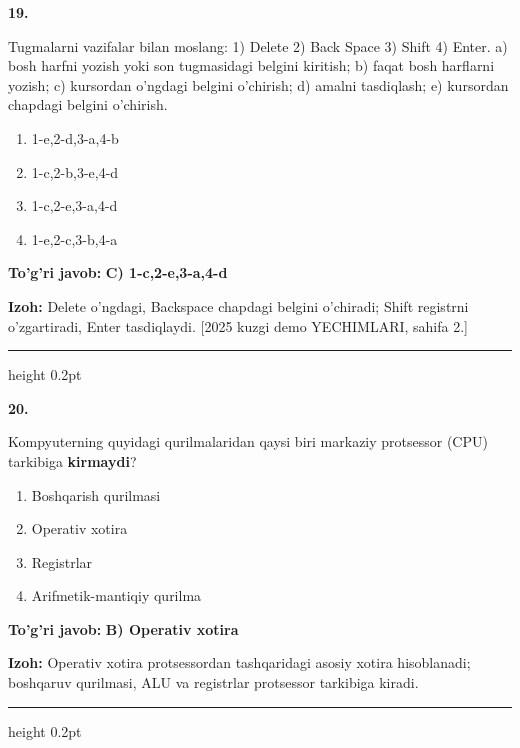 \documentclass[10pt,a4paper]{article}
\begin{document}
{\bfseries\sffamily\color{ink} 19.}
\par
Tugmalarni vazifalar bilan moslang: 1) Delete 2) Back Space 3) Shift 4) Enter. a) bosh harfni yozish yoki son tugmasidagi belgini kiritish; b) faqat bosh harflarni yozish; c) kursordan o'ngdagi belgini o'chirish; d) amalni tasdiqlash; e) kursordan chapdagi belgini o'chirish.
\begin{enumerate}[label=\Alph*),leftmargin=9mm]
\item 1-e,2-d,3-a,4-b
\item 1-c,2-b,3-e,4-d
\item 1-c,2-e,3-a,4-d
\item 1-e,2-c,3-b,4-a
\end{enumerate}
\begin{tcolorbox}[enhanced,breakable,colback=teal!4,colframe=teal!60!black,boxrule=0.45pt,arc=1.2mm,left=2.7mm,right=2.7mm,top=1.8mm,bottom=1.8mm,before skip=2mm,after skip=2mm]
{\bfseries\sffamily\color{teal}To'g'ri javob:} \textbf{C) 1-c,2-e,3-a,4-d}
\par\smallskip
{\bfseries Izoh:} Delete o'ngdagi, Backspace chapdagi belgini o'chiradi; Shift registrni o'zgartiradi, Enter tasdiqlaydi. [2025 kuzgi demo YECHIMLARI, sahifa 2.]
\end{tcolorbox}
\vspace{2mm}\hrule height 0.2pt\vspace{3mm}

{\bfseries\sffamily\color{ink} 20.}
\par
Kompyuterning quyidagi qurilmalaridan qaysi biri markaziy protsessor (CPU) tarkibiga \textbf{kirmaydi}?
\begin{enumerate}[label=\Alph*),leftmargin=9mm]
\item Boshqarish qurilmasi
\item Operativ xotira
\item Registrlar
\item Arifmetik-mantiqiy qurilma
\end{enumerate}
\begin{tcolorbox}[enhanced,breakable,colback=teal!4,colframe=teal!60!black,boxrule=0.45pt,arc=1.2mm,left=2.7mm,right=2.7mm,top=1.8mm,bottom=1.8mm,before skip=2mm,after skip=2mm]
{\bfseries\sffamily\color{teal}To'g'ri javob:} \textbf{B) Operativ xotira}
\par\smallskip
{\bfseries Izoh:} Operativ xotira protsessordan tashqaridagi asosiy xotira hisoblanadi; boshqaruv qurilmasi, ALU va registrlar protsessor tarkibiga kiradi.
\end{tcolorbox}
\vspace{2mm}\hrule height 0.2pt\vspace{3mm}
\end{document}
